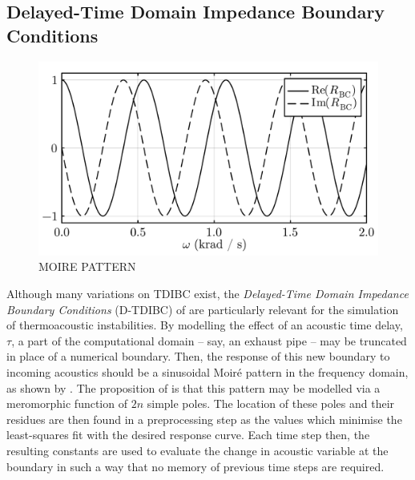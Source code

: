 


\subsection{Delayed-Time Domain Impedance Boundary Conditions}




\begin{figure}[t]
\centering
\includegraphics[scale=0.35]{assets/graphs/complex_R_Moire.pdf}
\caption{MOIRE PATTERN}
\label{fig:moire}
\end{figure}

Although many variations on TDIBC exist, the \emph{Delayed-Time Domain Impedance Boundary Conditions} (D-TDIBC) of \cite{douasbin2018DelayedtimeDomainImpedance} are particularly relevant for the simulation of thermoacoustic instabilities. By modelling the effect of an acoustic time delay, $τ$, a part of the computational domain -- say, an exhaust pipe -- may be truncated in place of a numerical boundary. Then, the response of this new boundary to incoming acoustics should be a sinusoidal Moiré pattern in the frequency domain, as shown by . The proposition of \cite{douasbin2018DelayedtimeDomainImpedance} is that this pattern may be modelled via a meromorphic function of $2n$ simple poles. The location of these poles and their residues are then found in a preprocessing step as the values which minimise the least-squares fit with the desired response curve. Each time step then, the resulting constants are used to evaluate the change in acoustic variable at the boundary in such a way that no memory of previous time steps are required. 

